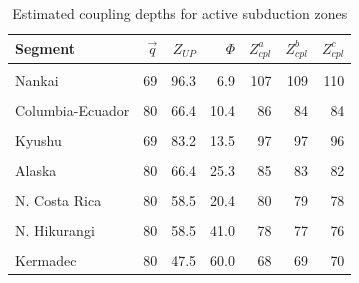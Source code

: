 \begin{table}

\caption{\label{tab:segs}Estimated coupling depths for active subduction zones}
\centering
\begin{threeparttable}
\begin{tabular}[t]{lrrrrrr}
\toprule
Segment & $\vec{q}$ & $Z_{UP}$ & $\Phi$ & $Z_{cpl}^a$ & $Z_{cpl}^b$ & $Z_{cpl}^c$\\
\midrule
\cellcolor{gray!6}{N. Cascadia} & \cellcolor{gray!6}{75} & \cellcolor{gray!6}{74.2} & \cellcolor{gray!6}{3.4} & \cellcolor{gray!6}{92} & \cellcolor{gray!6}{91} & \cellcolor{gray!6}{90}\\
Nankai & 69 & 96.3 & 6.9 & 107 & 109 & 110\\
\cellcolor{gray!6}{Mexico} & \cellcolor{gray!6}{72} & \cellcolor{gray!6}{98.1} & \cellcolor{gray!6}{7.2} & \cellcolor{gray!6}{108} & \cellcolor{gray!6}{111} & \cellcolor{gray!6}{112}\\
Columbia-Ecuador & 80 & 66.4 & 10.4 & 86 & 84 & 84\\
\cellcolor{gray!6}{S.C. Chile} & \cellcolor{gray!6}{80} & \cellcolor{gray!6}{66.4} & \cellcolor{gray!6}{20.0} & \cellcolor{gray!6}{85} & \cellcolor{gray!6}{84} & \cellcolor{gray!6}{83}\\
Kyushu & 69 & 83.2 & 13.5 & 97 & 97 & 96\\
\cellcolor{gray!6}{N. Sumatra} & \cellcolor{gray!6}{120} & \cellcolor{gray!6}{26.8} & \cellcolor{gray!6}{25.0} & \cellcolor{gray!6}{57} & \cellcolor{gray!6}{65} & \cellcolor{gray!6}{68}\\
Alaska & 80 & 66.4 & 25.3 & 85 & 83 & 82\\
\cellcolor{gray!6}{N. Chile} & \cellcolor{gray!6}{85} & \cellcolor{gray!6}{58.7} & \cellcolor{gray!6}{38.4} & \cellcolor{gray!6}{78} & \cellcolor{gray!6}{77} & \cellcolor{gray!6}{77}\\
N. Costa Rica & 80 & 58.5 & 20.4 & 80 & 79 & 78\\
\cellcolor{gray!6}{Aleutians} & \cellcolor{gray!6}{75} & \cellcolor{gray!6}{51.6} & \cellcolor{gray!6}{39.6} & \cellcolor{gray!6}{73} & \cellcolor{gray!6}{73} & \cellcolor{gray!6}{73}\\
N. Hikurangi & 80 & 58.5 & 41.0 & 78 & 77 & 76\\
\cellcolor{gray!6}{Mariana} & \cellcolor{gray!6}{80} & \cellcolor{gray!6}{47.5} & \cellcolor{gray!6}{54.6} & \cellcolor{gray!6}{69} & \cellcolor{gray!6}{70} & \cellcolor{gray!6}{70}\\
Kermadec & 80 & 47.5 & 60.0 & 68 & 69 & 70\\

\end{tabular}
\end{threeparttable}
\end{table}
